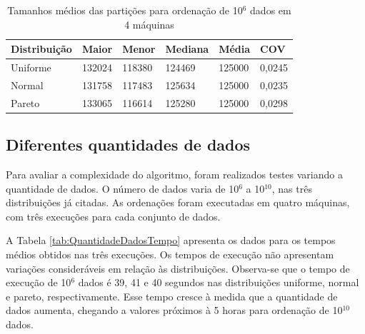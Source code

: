 \begin{table}[!htbp]
\centering
\begin{footnotesize}
\begin{tabular}{|C{20mm}|C{20mm}|C{20mm}|C{20mm}|C{20mm}|C{15mm}|	} \hline
Distribuição	&	Maior	&	Menor	&	Mediana	&	Média	&	COV	\\ \hline \hline
Uniforme	&	132024	&	118380	&	124469	&	125000	&	0,0245	\\ \hline
Normal	&	131758	&	117483	&	125634	&	125000	&	0,0235	\\ \hline
Pareto	&	133065	&	116614	&	125280	&	125000	&	0,0298	\\ \hline
\end{tabular}
\end{footnotesize}
\caption{Tamanhos médios das partições para ordenação de 10$^6$ dados em 4 máquinas}
\label{tab:ConjuntoParticoes}
\end{table}





\subsection{Diferentes quantidades de dados}

Para avaliar a complexidade do algoritmo, foram realizados testes variando a quantidade de dados. O número de dados varia de 10$^6$ a 10$^{10}$, nas três distribuições já citadas. As ordenações foram executadas em quatro máquinas, com três execuções para cada conjunto de dados. 

A Tabela \ref{tab:QuantidadeDadosTempo} apresenta os dados para os tempos médios obtidos nas três execuções. Os tempos de execução não apresentam variações consideráveis em relação às distribuições. Observa-se que o tempo de execução de 10$^6$ dados é 39, 41 e 40 segundos nas distribuições uniforme, normal e pareto, respectivamente. Esse tempo cresce à medida que a quantidade de dados aumenta, chegando a valores próximos à 5 horas para ordenação de 10$^{10}$ dados. 

